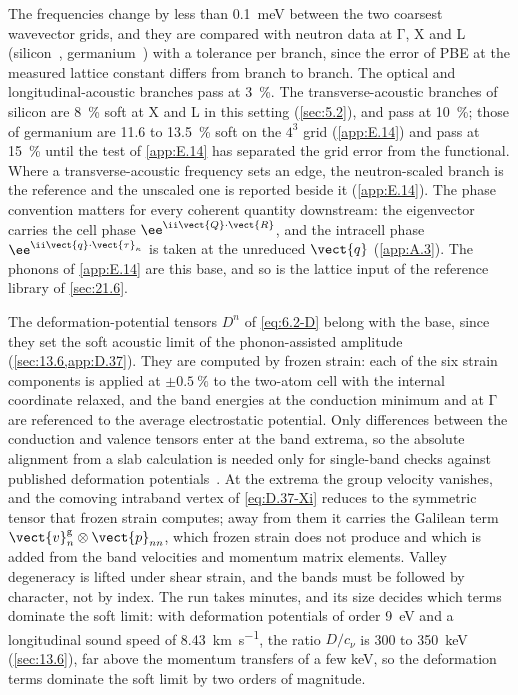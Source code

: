 The frequencies change by less than \SI{0.1}{meV} between the two coarsest wavevector grids, and they are compared with neutron data at $\mathrm{\Gamma}$, X and L (silicon~\cite{nilsson1972study}, germanium~\cite{nilsson1971phonon}) with a tolerance per branch, since the error of PBE at the measured lattice constant differs from branch to branch. The optical and longitudinal-acoustic branches pass at \SI{3}{\percent}. The transverse-acoustic branches of silicon are \SI{8}{\percent} soft at X and L in this setting (\cref{sec:5.2}), and pass at \SI{10}{\percent}; those of germanium are 11.6 to \SI{13.5}{\percent} soft on the $4^3$ grid (\cref{app:E.14}) and pass at \SI{15}{\percent} until the test of \cref{app:E.14} has separated the grid error from the functional. Where a transverse-acoustic frequency sets an edge, the neutron-scaled branch is the reference and the unscaled one is reported beside it (\cref{app:E.14}). The phase convention matters for every coherent quantity downstream: the eigenvector carries the cell phase $\ee^{\ii\vect{Q}\cdot\vect{R}}$, and the intracell phase $\ee^{\ii\vect{q}\cdot\vect{\tau}_\kappa}$ is taken at the unreduced $\vect{q}$ (\cref{app:A.3}). The phonons of \cref{app:E.14} are this base, and so is the lattice input of the reference library of \cref{sec:21.6}.

The deformation-potential tensors $D^n$ of \cref{eq:6.2-D} belong with the base, since they set the soft acoustic limit of the phonon-assisted amplitude (\cref{sec:13.6,app:D.37}). They are computed by frozen strain: each of the six strain components is applied at $\pm\SI{0.5}{\percent}$ to the two-atom cell with the internal coordinate relaxed, and the band energies at the conduction minimum and at $\mathrm{\Gamma}$ are referenced to the average electrostatic potential. Only differences between the conduction and valence tensors enter at the band extrema, so the absolute alignment from a slab calculation is needed only for single-band checks against published deformation potentials~\cite{li2021deformation}. At the extrema the group velocity vanishes, and the comoving intraband vertex of \cref{eq:D.37-Xi} reduces to the symmetric tensor that frozen strain computes; away from them it carries the Galilean term $\vect{v}^{\mathrm{g}}_n\otimes\vect{p}_{nn}$, which frozen strain does not produce and which is added from the band velocities and momentum matrix elements. Valley degeneracy is lifted under shear strain, and the bands must be followed by character, not by index. The run takes minutes, and its size decides which terms dominate the soft limit: with deformation potentials of order \SI{9}{eV} and a longitudinal sound speed of \SI{8.43}{km.s^{-1}}, the ratio $D/c_\nu$ is 300 to \SI{350}{keV} (\cref{sec:13.6}), far above the momentum transfers of a few keV, so the deformation terms dominate the soft limit by two orders of magnitude.

